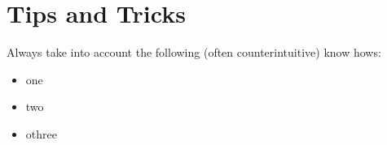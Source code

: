 \section{Tips and Tricks}
\label{sec:tips-and-tricks}

Always take into account the following (often counterintuitive) know hows:
\begin{itemize}
	\item one
	\item two
	\item othree
\end{itemize}
